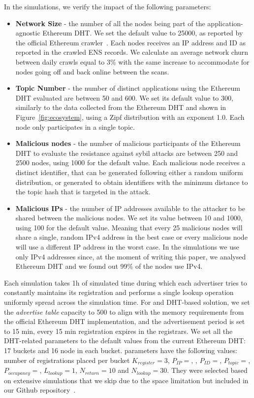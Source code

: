 In the simulations, we verify the impact of the following parameters:
 \begin{itemize}
     \item \textbf{Network Size} - the number of all the nodes being part of the application-agnostic Ethereum DHT. We set the default value to 25000, as reported by the official Ethereum crawler~\cite{discv4-dns-lists}. Each nodes receives an IP address and ID as reported in the crawled ENS records. We calculate an average network churn between daily crawls equal to 3\% with the same increase to accommodate for nodes going off and back online between the scans. 
     \item \textbf{Topic Number} - the number of distinct applications using the Ethereum DHT evaluated are between 50 and 600. We set its default value to 300, similarly to the data collected from the Ethereum DHT and shown in Figure~\ref{fig:ecosystem}, using a Zipf distribution with an exponent 1.0.  Each node only participates in a single topic.
     \item \textbf{Malicious nodes} - the number of malicious participants of the Ethereum DHT to evaluate the resistance against sybil attacks are between 250 and 2500 nodes,  using 1000 for the default value.  Each malicious node receives a distinct identifier, that can be generated following either a random uniform distribution,  or generated to obtain identifiers with the minimum distance to the topic hash that is targeted in the attack.
     \item \textbf{Malicious IPs} - the number of IP addresses available to the attacker to be shared between the malicious nodes. We set its value between 10 and 1000,  using 100 for the default value.  Meaning that every 25 malicious nodes will share a single, random IPv4 address in the best case or every malicious node will use a different IP address in the worst case.  
In the simulations we use only IPv4 addresses since, at the moment of writing this paper,  we analysed  Ethereum DHT and we found out 99\% of the nodes use IPv4.
 \end{itemize}
 
Each simulation takes 1h of simulated time during which each advertiser tries to constantly maintains its registration and performs a single lookup operation uniformly spread across the simulation time.  For \sysname and DHT-based solution, we set the \emph{advertise table} capacity to 500  to align with the memory requirements from the official Ethereum DHT implementation, and the advertisement period is set to 15 min, \ie every 15 min registration expires in the registrars. 
We set all the DHT-related parameters to the default values from the current Ethereum DHT: 17 buckets and 16 node in each bucket.
 \sysname parameters have the following values: number of registrations placed per bucket $K_{register}= 3$, $P_{IP} = $, , $P_{ID} = $, $P_{topic} = $, $P_{occupancy} = $,  $L_\textit{lookup}=1$, $N_\textit{return}=10$ and $N_\textit{lookup}=30$. 
They were selected based on extensive simulations that we skip due to the space limitation but included in our Github repository~\cite{our_repo}. 

